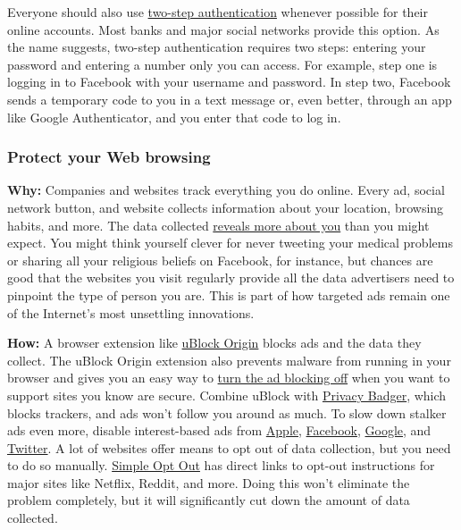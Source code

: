Everyone should also use
\href{https://www.nytimes.com/2019/03/27/technology/personaltech/two-step-authentication.html}{two-step
authentication} whenever possible for their online accounts. Most banks
and major social networks provide this option. As the name suggests,
two-step authentication requires two steps: entering your password and
entering a number only you can access. For example, step one is logging
in to Facebook with your username and password. In step two, Facebook
sends a temporary code to you in a text message or, even better, through
an app like Google Authenticator, and you enter that code to log in.~

\hypertarget{protect-your-web-browsing}{%
\subsubsection{Protect your Web
browsing}\label{protect-your-web-browsing}}

\textbf{Why:} Companies and websites track everything you do online.
Every ad, social network button, and website collects information about
your location, browsing habits, and more. The data collected
\href{https://www.nytimes.com/2018/08/15/technology/personaltech/stop-targeted-stalker-ads.html}{reveals
more about you} than you might expect. You might think yourself clever
for never tweeting your medical problems or sharing all your religious
beliefs on Facebook, for instance, but chances are good that the
websites you visit regularly provide all the data advertisers need to
pinpoint the type of person you are. This is part of how targeted ads
remain one of the Internet's most unsettling innovations.

\textbf{How:} A browser extension like
\href{https://github.com/gorhill/uBlock}{uBlock Origin} blocks ads and
the data they collect. The uBlock Origin extension also prevents malware
from running in your browser and gives you an easy way to
\href{https://github.com/gorhill/uBlock/wiki/How-to-whitelist-a-web-site}{turn
the ad blocking off} when you want to support sites you know are secure.
Combine uBlock with \href{https://www.eff.org/privacybadger}{Privacy
Badger}, which blocks trackers, and ads won't follow you around as much.
To slow down stalker ads even more, disable interest-based ads from
\href{https://support.apple.com/en-us/HT202074}{Apple},
\href{https://www.facebook.com/help/568137493302217}{Facebook},
\href{https://support.google.com/ads/answer/2662922?hl=en}{Google}, and
\href{https://business.twitter.com/en/help/ads-policies/other-policy-requirements/interest-based-opt-out-policy.html}{Twitter}.
A lot of websites offer means to opt out of data collection, but you
need to do so manually. \href{http://simpleoptout.com/}{Simple Opt Out}
has direct links to opt-out instructions for major sites like Netflix,
Reddit, and more. Doing this won't eliminate the problem completely, but
it will significantly cut down the amount of data collected.


